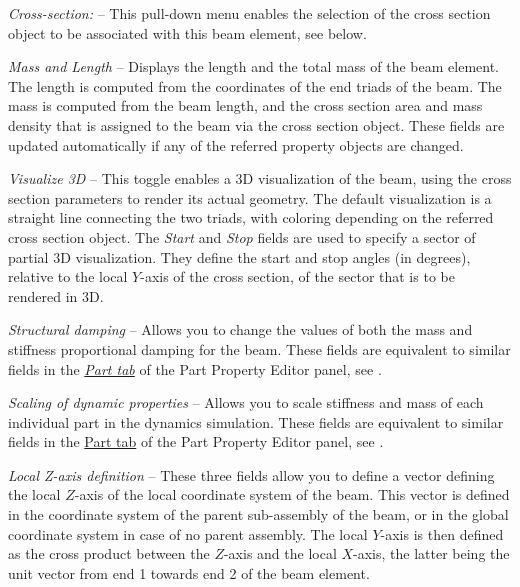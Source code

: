 \begin{bulletlist}
\item{\sl Cross-section:} --
  This pull-down menu enables the selection of the cross section object
  to be associated with this beam element, see
   below.

\item{\sl Mass and Length} --
  Displays the length and the total mass of the beam element.
  The length is computed from the coordinates of the end triads of the beam.
  The mass is computed from the beam length, and the cross section area and mass
  density that is assigned to the beam via the cross section object.
  These fields are updated automatically if any of the referred property objects
  are changed.

\item{\sl Visualize 3D} --
  This toggle enables a 3D visualization of the beam, using the cross section
  parameters to render its actual geometry.
  The default visualization is a straight line connecting the two triads,
  with coloring depending on the referred cross section object.
  The {\sl Start} and {\sl Stop} fields are used to specify a sector of partial
  3D visualization. They define the start and stop angles (in degrees),
  relative to the local $Y$-axis of the cross section,
  of the sector that is to be rendered in 3D.

\item{\sl Structural damping} --
  Allows you to change the values of both the mass and stiffness proportional
  damping for the beam. These fields are equivalent to similar fields in the
  \protect\hyperlink{part-tab}{\sl Part tab} of the Part Property Editor panel,
  see .

\item{\sl Scaling of dynamic properties} --
  Allows you to scale stiffness and mass of each individual part in the
  dynamics simulation. These fields are equivalent to similar fields in the
  \protect\hyperlink{part-tab}{Part tab} of the Part Property Editor panel,
  see .

\item{\sl Local Z-axis definition} --
  These three fields allow you to define a vector defining the local $Z$-axis
  of the local coordinate system of the beam. This vector is defined in the
  coordinate system of the parent sub-assembly of the beam,
  or in the global coordinate system in case of no parent assembly.
  The local $Y$-axis is then defined as the cross product between the $Z$-axis
  and the local $X$-axis, the latter being the unit vector from end 1 towards
  end 2 of the beam element.

\end{bulletlist}

